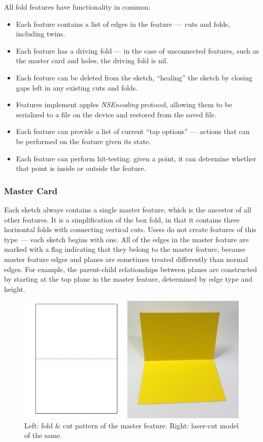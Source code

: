 All fold features have functionality in common:

\begin{itemize}
\itemsep1pt\parskip0pt
\item
  Each feature contains a list of edges in the feature ---~cuts and
  folds, including twins.
\item
  Each feature has a driving fold --- in the case of unconnected
  features, such as the master card and holes, the driving fold is nil.
\item
  Each feature can be deleted from the sketch, ``healing'' the sketch by
  closing gaps left in any existing cuts and folds.
\item
  Features implement apples \emph{NSEncoding} protocol, allowing them to
  be serialized to a file on the device and restored from the saved
  file.
\item
  Each feature can provide a list of current ``tap options'' --- actions
  that can be performed on the feature given its state.
\item
  Each feature can perform hit-testing: given a point, it can determine
  whether that point is inside or outside the feature.
\end{itemize}

\subsubsection{Master Card}\label{master-card}

Each sketch always contains a single master feature, which is the
ancestor of all other features. It is a simplification of the box fold,
in that it contains three horizontal folds with connecting vertical
cuts. Users do not create features of this type~--- each sketch begins
with one. All of the edges in the master feature are marked with a flag
indicating that they belong to the master feature, because master
feature edges and planes are sometimes treated differently than normal
edges. For example, the parent-child relationships between planes are
constructed by starting at the top plane in the master feature,
determined by edge type and height.

\begin{figure}[htbp]
\centering
\includegraphics{figures/33_UI_Interface_Data_Structures/mastercard.pdf}
\caption{Left: fold \& cut pattern of the master feature. Right:
laser-cut model of the same.}
\end{figure}

